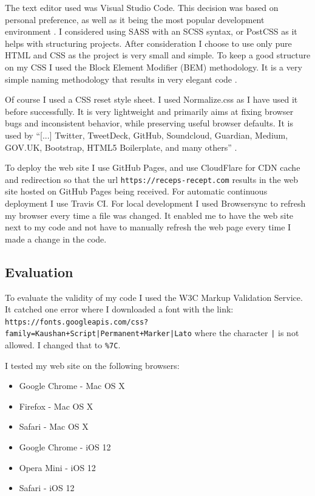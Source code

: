 \documentclass[a4paper]{scrartcl}
\begin{document}
The text editor used was Visual Studio Code. This decision was based on personal preference, as well as it being the most popular development environment \cite{Stackoverflow}. I considered using SASS with an SCSS syntax, or PostCSS as it helps with structuring projects. After consideration I choose to use only pure HTML and CSS as the project is very small and simple. To keep a good structure on my CSS I used the Block Element Modifier (BEM) methodology. It is a very simple naming methodology that results in very elegant code \cite{Starkov}.

Of course I used a CSS reset style sheet. I used Normalize.css as I have used it before successfully. It is very lightweight and primarily aims at fixing browser bugs and inconsistent behavior, while preserving useful browser defaults. It is used by ``[...] Twitter, TweetDeck, GitHub, Soundcloud, Guardian, Medium, GOV.UK, Bootstrap, HTML5 Boilerplate, and many others'' \cite{Gallagher}.

To deploy the web site I use GitHub Pages, and use CloudFlare for CDN cache and redirection so that the url \texttt{https://receps-recept.com} results in the web site hosted on GitHub Pages being received. For automatic continuous deployment I use Travis CI. For local development I used Browsersync to refresh my browser every time a file was changed. It enabled me to have the web site next to my code and not have to manually refresh the web page every time I made a change in the code.

\subsection{Evaluation}
\label{method:evaluation}

To evaluate  the validity of my code I used the W3C Markup Validation Service. It catched one error where I downloaded a font with the link:\\ \small{\texttt{https://fonts.googleapis.com/css?family=Kaushan+Script|Permanent+Marker|Lato}} where the character \texttt{|} is not allowed. I changed that to \texttt{\%7C}.

I tested my web site on the following browsers:
\begin{itemize}
	\item Google Chrome - Mac OS X
	\item Firefox - Mac OS X
	\item Safari - Mac OS X
	\item Google Chrome - iOS 12
	\item Opera Mini - iOS 12
	\item Safari - iOS 12
\end{itemize}
\end{document}
